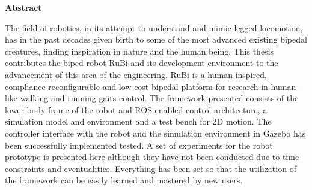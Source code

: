 \newenvironment{abstract}%
    {\null\vfill\begin{center}%
    \bfseries Abstract\end{center}}%
    {\vfill\null}
        \begin{abstract}
        The field of robotics, in its attempt to understand and mimic legged locomotion, has in the past decades given birth to some of the most advanced existing bipedal creatures, finding inspiration in nature and the human being.
        This thesis contributes the biped robot RuBi and its development environment to the advancement of this area of the engineering.
        RuBi is a human-inspired, compliance-reconfigurable and low-cost bipedal platform for research in human-like walking and running gaits control.
        The framework presented consists of the lower body frame of the robot and ROS enabled control architecture, a simulation model and environment and a test bench for 2D motion.
        The controller interface with the robot and the simulation environment in Gazebo has been successfully implemented tested.
        A set of experiments for the robot prototype is presented here although they have not been conducted due to time constraints and eventualities.
        Everything has been set so that the utilization of the framework can be easily learned and mastered by new users.
        \end{abstract}